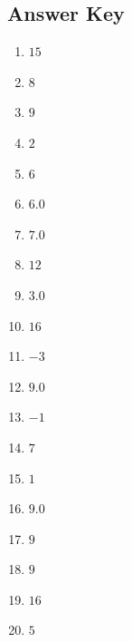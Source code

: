 \documentclass{article}
\begin{document}
\newpage

\subsection*{Answer Key}

\begin{enumerate}
\item $\displaystyle 15 $ \ 
\item $\displaystyle 8 $ \ 
\item $\displaystyle 9 $ \ 
\item $\displaystyle 2 $ \ 
\item $\displaystyle 6 $ \ 
\item $\displaystyle 6.0 $ \ 
\item $\displaystyle 7.0 $ \ 
\item $\displaystyle 12 $ \ 
\item $\displaystyle 3.0 $ \ 
\item $\displaystyle 16 $ \ 
\item $\displaystyle -3 $ \ 
\item $\displaystyle 9.0 $ \ 
\item $\displaystyle -1 $ \ 
\item $\displaystyle 7 $ \ 
\item $\displaystyle 1 $ \ 
\item $\displaystyle 9.0 $ \ 
\item $\displaystyle 9 $ \ 
\item $\displaystyle 9 $ \ 
\item $\displaystyle 16 $ \ 
\item $\displaystyle 5 $ \ 

\end{enumerate}
\end{document}
